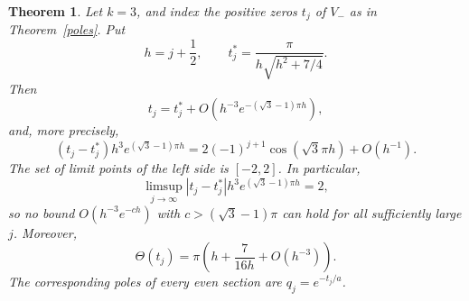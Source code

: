 \documentclass[11pt]{amsart}
\newtheorem{theorem}{Theorem}[section]
\theoremstyle{definition}
\theoremstyle{remark}
\numberwithin{equation}{section}
\begin{document}
\begin{theorem}\label{cubicpoles}
Let $k=3$, and index the positive zeros $t_j$ of $V_-$ as in
Theorem~\ref{poles}. Put
\[
 h=j+\frac12,\qquad t_j^*=\frac{\pi}{h\sqrt{h^2+7/4}}.
\]
Then
\begin{equation}\label{cubicpolelaw}
 t_j=t_j^*+O\!\left(h^{-3}e^{-(\sqrt3-1)\pi h}\right),
\end{equation}
and, more precisely,
\begin{equation}\label{cubicsharp}
 (t_j-t_j^*)h^3e^{(\sqrt3-1)\pi h}
 =2(-1)^{j+1}\cos(\sqrt3\pi h)+O(h^{-1}).
\end{equation}
The set of limit points of the left side is $[-2,2]$. In particular,
\[
 \limsup_{j\to\infty}|t_j-t_j^*|h^3e^{(\sqrt3-1)\pi h}=2,
\]
so no bound $O(h^{-3}e^{-ch})$ with $c>(\sqrt3-1)\pi$ can hold for all
sufficiently large $j$. Moreover,
\begin{equation}\label{refinedphase}
 \Theta(t_j)=\pi\left(h+\frac7{16h}+O(h^{-3})\right).
\end{equation}
The corresponding poles of every even section are $q_j=e^{-t_j/a}$.
\end{theorem}
\end{document}

